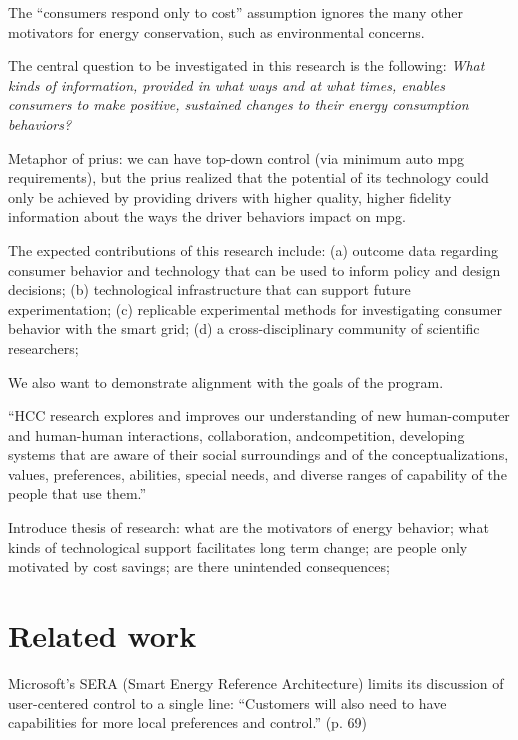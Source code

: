 The ``consumers respond only to cost'' assumption ignores the many other
motivators for energy conservation, such as environmental concerns.  

The central question to be investigated in this
research is the following: {\em What kinds of information, provided in what ways and at what
times, enables consumers to make positive, sustained changes to their
energy consumption behaviors?}


Metaphor of prius:  we can have top-down control (via minimum auto mpg
requirements), but the prius realized that the potential of its technology
could only be achieved by providing drivers with higher quality, higher
fidelity information about the ways the driver behaviors impact on mpg.  






The expected contributions of this research include: (a) outcome data
regarding consumer behavior and technology that can be used to inform
policy and design decisions; (b) technological infrastructure that can
support future experimentation; (c) replicable experimental methods for
investigating consumer behavior with the smart grid; (d) a
cross-disciplinary community of scientific researchers; 


We also want to demonstrate alignment with the goals of the program.

``HCC research explores and improves our understanding of new
human-computer and human-human interactions, collaboration, andcompetition, developing systems that are aware of their social surroundings
and of the conceptualizations, values, preferences, abilities, special
needs, and diverse ranges of capability of the people that use them.''

Introduce thesis of research: what are the motivators of energy behavior;
what kinds of technological support facilitates long term change; are
people only motivated by cost savings; are there unintended consequences;




\section{Related work}

Microsoft's SERA (Smart Energy Reference Architecture) limits its
discussion of user-centered control to a single line: ``Customers will also
need to have capabilities for more local preferences and control.''
(p. 69)

